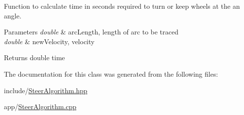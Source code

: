 Function to calculate time in seconds required to turn or keep wheels at the an angle. 


\begin{DoxyParams}{Parameters}
{\em double} & arc\+Length, length of arc to be traced \\
\hline
{\em double} & new\+Velocity, velocity \\
\hline
\end{DoxyParams}
\begin{DoxyReturn}{Returns}
double time 
\end{DoxyReturn}


The documentation for this class was generated from the following files\+:\begin{DoxyCompactItemize}
\item 
include/\hyperlink{_steer_algorithm_8hpp}{Steer\+Algorithm.\+hpp}\item 
app/\hyperlink{_steer_algorithm_8cpp}{Steer\+Algorithm.\+cpp}\end{DoxyCompactItemize}
